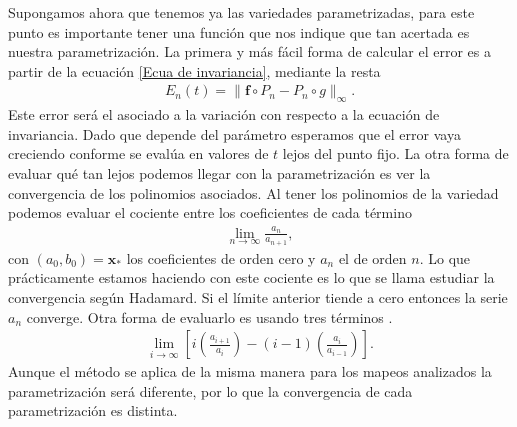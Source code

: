Supongamos ahora que tenemos ya las variedades parametrizadas, para este punto es importante tener una función que nos indique que tan acertada es nuestra parametrización. La primera y más fácil forma de calcular el error es a partir de la ecuación \eqref{Ecua de invariancia}, mediante la resta
\begin{eqnarray}
E_{n}(t) = \parallel \mathbf{f} \circ P_{n} - P_{n} \circ g \parallel_{\infty}.  \label{Ecua de invariancia resta}
\end{eqnarray}
Este error será el asociado a la variación con respecto a la ecuación de invariancia. Dado que depende del parámetro esperamos que el error vaya creciendo conforme se evalúa en valores de $t$ lejos del punto fijo. La otra forma de evaluar qué tan lejos podemos llegar con la parametrización es ver la convergencia de los polinomios asociados. Al tener los polinomios de la variedad podemos evaluar el cociente entre los coeficientes de cada término
\begin{eqnarray}
\lim_{n\rightarrow\infty}\frac{a_{n}}{a_{n+1}},\label{hadamard}
\end{eqnarray} 
con $(a_{0},b_{0})=\mathbf{x}_{*}$ los coeficientes de orden cero y $a_{n}$ el de orden $n$. Lo que prácticamente estamos haciendo con este cociente es lo que se llama estudiar la convergencia según Hadamard. Si el límite anterior tiende a cero entonces la serie $a_{n}$ converge. Otra forma de evaluarlo es usando tres términos \citep{Chang}.
\begin{eqnarray}
\lim_{i\rightarrow\infty} \left[ i\left(\frac{a_{i+1}}{a_{i}}\right)-(i-1)\left(\frac{a_{i}}{a_{i-1}}\right) \right].
\label{tres terminos}
\end{eqnarray}
Aunque el método se aplica de la misma manera para los mapeos analizados la parametrización será diferente, por lo que la convergencia de cada parametrización es distinta. 